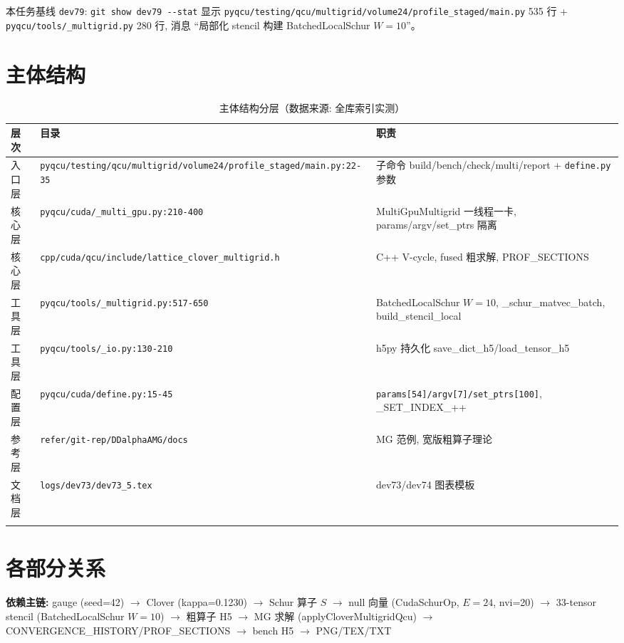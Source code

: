 \documentclass[UTF8]{ctexart}
\begin{document}
\noindent 本任务基线 \texttt{\nolinkurl{dev79}}: \texttt{\nolinkurl{git show dev79 --stat}} 显示 \texttt{\nolinkurl{pyqcu/testing/qcu/multigrid/volume24/profile_staged/main.py}} 535 行 + \texttt{\nolinkurl{pyqcu/tools/_multigrid.py}} 280 行, 消息 ``局部化 stencil 构建 BatchedLocalSchur $W=10$''。

\section{主体结构}
\begin{xltabular}{\textwidth}{llX}
\toprule
\textcolor{struct}{层次} & 目录 & \textcolor{struct}{职责} \\
\midrule
\endhead
入口层 & \texttt{\nolinkurl{pyqcu/testing/qcu/multigrid/volume24/profile_staged/main.py:22-35}} & 子命令 build/bench/check/multi/report + \texttt{\nolinkurl{define.py}} 参数 \\
核心层 & \texttt{\nolinkurl{pyqcu/cuda/_multi_gpu.py:210-400}} & MultiGpuMultigrid 一线程一卡, params/argv/set\_ptrs 隔离 \\
核心层 & \texttt{\nolinkurl{cpp/cuda/qcu/include/lattice_clover_multigrid.h}} & C++ V-cycle, fused 粗求解, PROF\_SECTIONS \\
工具层 & \texttt{\nolinkurl{pyqcu/tools/_multigrid.py:517-650}} & BatchedLocalSchur $W=10$, \_schur\_matvec\_batch, build\_stencil\_local \\
工具层 & \texttt{\nolinkurl{pyqcu/tools/_io.py:130-210}} & h5py 持久化 save\_dict\_h5/load\_tensor\_h5 \\
配置层 & \texttt{\nolinkurl{pyqcu/cuda/define.py:15-45}} & \texttt{\nolinkurl{params[54]/argv[7]/set_ptrs[100]}}, \_SET\_INDEX\_++ \\
参考层 & \texttt{\nolinkurl{refer/git-rep/DDalphaAMG/docs}} & MG 范例, 宽版粗算子理论 \\
文档层 & \texttt{\nolinkurl{logs/dev73/dev73_5.tex}} & dev73/dev74 图表模板 \\
\bottomrule
\caption{主体结构分层（数据来源: 全库索引实测）}
\end{xltabular}

\section{各部分关系}
\begin{keybox}
\textbf{依赖主链:} \textcolor{relation}{gauge (seed=42) $\to$ Clover (kappa=0.1230) $\to$ Schur 算子 $S$ $\to$ null 向量 (CudaSchurOp, $E=24$, nvi=20) $\to$ 33-tensor stencil (BatchedLocalSchur $W=10$) $\to$ 粗算子 H5 $\to$ MG 求解 (applyCloverMultigridQcu) $\to$ CONVERGENCE\_HISTORY/PROF\_SECTIONS $\to$ bench H5 $\to$ PNG/TEX/TXT}
\end{keybox}
\end{document}
